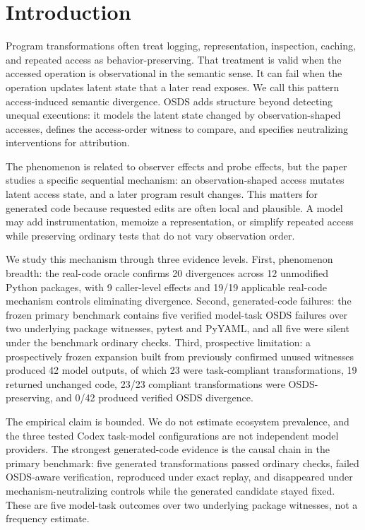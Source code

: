 \section{Introduction}

Program transformations often treat logging, representation, inspection, caching, and repeated access as behavior-preserving. That treatment is valid when the accessed operation is observational in the semantic sense. It can fail when the operation updates latent state that a later read exposes. We call this pattern access-induced semantic divergence. OSDS adds structure beyond detecting unequal executions: it models the latent state changed by observation-shaped accesses, defines the access-order witness to compare, and specifies neutralizing interventions for attribution.

The phenomenon is related to observer effects and probe effects, but the paper studies a specific sequential mechanism: an observation-shaped access mutates latent access state, and a later program result changes. This matters for generated code because requested edits are often local and plausible. A model may add instrumentation, memoize a representation, or simplify repeated access while preserving ordinary tests that do not vary observation order.

We study this mechanism through three evidence levels. First, phenomenon breadth: the real-code oracle confirms 20 divergences across 12 unmodified Python packages, with 9 caller-level effects and 19/19 applicable real-code mechanism controls eliminating divergence. Second, generated-code failures: the frozen primary benchmark contains five verified model-task OSDS failures over two underlying package witnesses, pytest and PyYAML, and all five were silent under the benchmark ordinary checks. Third, prospective limitation: a prospectively frozen expansion built from previously confirmed unused witnesses produced 42 model outputs, of which 23 were task-compliant transformations, 19 returned unchanged code, 23/23 compliant transformations were OSDS-preserving, and 0/42 produced verified OSDS divergence.

The empirical claim is bounded. We do not estimate ecosystem prevalence, and the three tested Codex task-model configurations are not independent model providers. The strongest generated-code evidence is the causal chain in the primary benchmark: five generated transformations passed ordinary checks, failed OSDS-aware verification, reproduced under exact replay, and disappeared under mechanism-neutralizing controls while the generated candidate stayed fixed. These are five model-task outcomes over two underlying package witnesses, not a frequency estimate.

